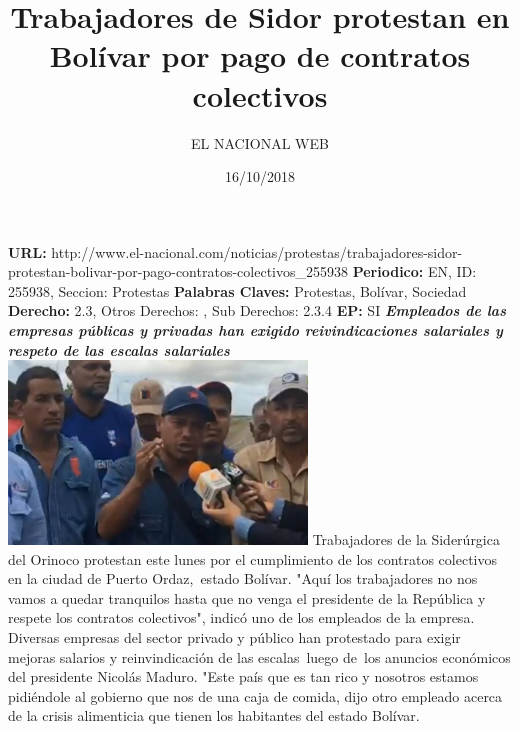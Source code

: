 \documentclass{article}%
\title{\textbf{Trabajadores de Sidor protestan en Bolívar por pago de contratos colectivos}}%
\author{EL NACIONAL WEB}%
\date{16/10/2018}%
\begin{document}
%
\normalsize%
\maketitle%
\textbf{URL: }%
http://www.el{-}nacional.com/noticias/protestas/trabajadores{-}sidor{-}protestan{-}bolivar{-}por{-}pago{-}contratos{-}colectivos\_255938\newline%
%
\textbf{Periodico: }%
EN, %
ID: %
255938, %
Seccion: %
Protestas\newline%
%
\textbf{Palabras Claves: }%
Protestas, Bolívar, Sociedad\newline%
%
\textbf{Derecho: }%
2.3, %
Otros Derechos: %
, %
Sub Derechos: %
2.3.4\newline%
%
\textbf{EP: }%
SI\newline%
\newline%
%
\textbf{\textit{Empleados de las empresas públicas y privadas han exigido reivindicaciones salariales y respeto de las escalas salariales}}%
\newline%
\newline%
%
\includegraphics[width=300px]{41.jpg}%
\newline%
%
Trabajadores de la Siderúrgica del Orinoco protestan este lunes por el cumplimiento de los contratos colectivos en la ciudad de Puerto Ordaz,~estado Bolívar.%
\newline%
%
"Aquí los trabajadores no nos vamos a quedar tranquilos hasta que no venga el presidente de la República y respete los contratos colectivos", indicó uno de los empleados de la empresa.%
\newline%
%
Diversas empresas del sector privado y público han protestado para exigir mejoras salarios y reinvindicación de las escalas~luego de~los anuncios económicos del presidente Nicolás Maduro.%
\newline%
%
"Este país que es tan rico y nosotros estamos pidiéndole al gobierno que nos de una caja de comida, dijo otro empleado acerca de la crisis alimenticia que tienen los habitantes del estado Bolívar.%
\newline%
%
\end{document}
